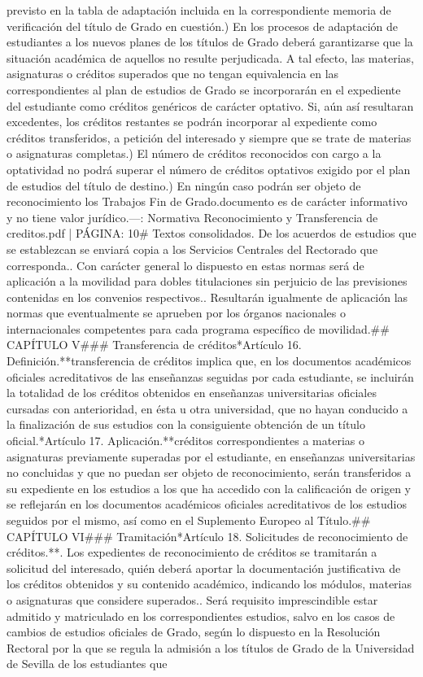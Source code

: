 \documentclass{article}
\begin{document}
\begin{itemize}
previsto en la tabla de adaptación incluida en la correspondiente memoria de verificación del título de Grado en cuestión.\n{}) En los procesos de adaptación de estudiantes a los nuevos planes de los títulos de Grado deberá garantizarse que la situación académica de aquellos no resulte perjudicada. A tal efecto, las materias, asignaturas o créditos superados que no tengan equivalencia en las correspondientes al plan de estudios de Grado se incorporarán en el expediente del estudiante como créditos genéricos de carácter optativo. Si, aún así resultaran excedentes, los créditos restantes se podrán incorporar al expediente como créditos transferidos, a petición del interesado y siempre que se trate de materias o asignaturas completas.\n{}) El número de créditos reconocidos con cargo a la optatividad no podrá superar el número de créditos optativos exigido por el plan de estudios del título de destino.\n{}) En ningún caso podrán ser objeto de reconocimiento los Trabajos Fin de Grado.\n\nEste documento es de carácter informativo y no tiene valor jurídico.\n\n---\n\nFUENTE: Normativa Reconocimiento y Transferencia de creditos.pdf | PÁGINA: 10\n# Textos consolidados\n{}. De los acuerdos de estudios que se establezcan se enviará copia a los Servicios Centrales del Rectorado que corresponda.. Con carácter general lo dispuesto en estas normas será de aplicación a la movilidad para dobles titulaciones sin perjuicio de las previsiones contenidas en los convenios respectivos.. Resultarán igualmente de aplicación las normas que eventualmente se aprueben por los órganos nacionales o internacionales competentes para cada programa específico de movilidad.\n\n## CAPÍTULO V\n### Transferencia de créditos\n**Artículo 16. Definición.**\nLa transferencia de créditos implica que, en los documentos académicos oficiales acreditativos de las enseñanzas seguidas por cada estudiante, se incluirán la totalidad de los créditos obtenidos en enseñanzas universitarias oficiales cursadas con anterioridad, en ésta u otra universidad, que no hayan conducido a la finalización de sus estudios con la consiguiente obtención de un título oficial.\n\n**Artículo 17. Aplicación.**\nLos créditos correspondientes a materias o asignaturas previamente superadas por el estudiante, en enseñanzas universitarias no concluidas y que no puedan ser objeto de reconocimiento, serán transferidos a su expediente en los estudios a los que ha accedido con la calificación de origen y se reflejarán en los documentos académicos oficiales acreditativos de los estudios seguidos por el mismo, así como en el Suplemento Europeo al Título.\n\n## CAPÍTULO VI\n### Tramitación\n**Artículo 18. Solicitudes de reconocimiento de créditos.**. Los expedientes de reconocimiento de créditos se tramitarán a solicitud del interesado, quién deberá aportar la documentación justificativa de los créditos obtenidos y su contenido académico, indicando los módulos, materias o asignaturas que considere superados.. Será requisito imprescindible estar admitido y matriculado en los correspondientes estudios, salvo en los casos de cambios de estudios oficiales de Grado, según lo dispuesto en la Resolución Rectoral por la que se regula la admisión a los títulos de Grado de la Universidad de Sevilla de los estudiantes que 
\end{itemize}
\end{document}
